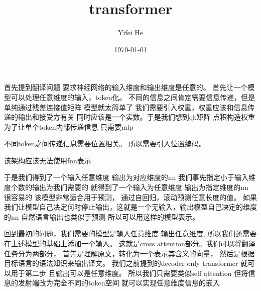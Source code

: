 \documentclass[a4paper, 12pt, UTF8]{ctexart}
\title{transformer}
\author{Yifei He}
\date{\today}
\theoremstyle{theoremstyle}
\theoremstyle{propertystyle}
\theoremstyle{definitionstyle}
\theoremstyle{algorithmstyle}
\begin{document}
\maketitle
首先提到翻译问题 要求神经网络的输入维度和输出维度是任意的。
首先让一个模型可以处理任意维度的输入，token化。
不同的信息之间肯定需要信息传递，但是单纯通过残差连接值矩阵 模型就太简单了
我们需要引入权重，权重应该和信息传递的输出和接受方有关 同时应该是一个实数。于是我们想到qk矩阵 点积构造权重
为了让单个token内部传递信息 只需要mlp

不同token之间传递信息需要位置相关。
所以需要引入位置编码。

该架构应该无法使用fnn表示

于是我们得到了一个输入任意维度 输出为对应维度的nn
我们事先指定小于输入维度个数的输出为我们需要的 就得到了一个输入为任意维度 输出为指定维度的nn
很容易的 该模型非常适合用于预测，
通过自回归，滚动预测任意长度的值。
如果我们让模型自己决定何时停止输出，这就是一个无输入，输出模型自己决定的维度的nn
自然语言输出也类似于预测 所以可以用这样的模型表示。

回到最初的问题，我们需要的模型是输入任意维度 输出任意维度, 所以我们还需要在上述模型的基础上添加一个输入。
这就是cross attention部分。我们可以将翻译任务分为两部分，
首先是理解原文，转化为一个表示其含义的向量，
然后是根据目标语言的语法知识来输出译文。
我们之前提到的decoder only transformer 就可以用于第二步 且输出可以是任意维度。
所以我们只需要类似self attention 但将信息的发射端改为完全不同的token空间 就可以实现任意维度信息的嵌入



\end{document}
